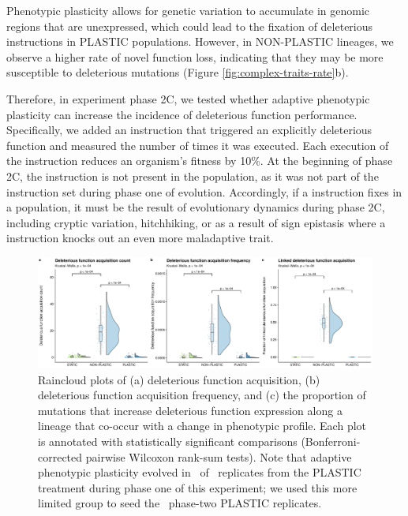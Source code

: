 \begin{raggedbottom}
Phenotypic plasticity allows for genetic variation to accumulate in genomic regions that are unexpressed, which could lead to the fixation of deleterious instructions in PLASTIC populations.
However, in NON-PLASTIC lineages, we observe a higher rate of novel function loss, indicating that they may be more susceptible to deleterious mutations (Figure \ref{fig:complex-traits-rate}b).

Therefore, in experiment phase 2C, we tested whether adaptive phenotypic plasticity can increase the incidence of deleterious function performance.
Specifically, we added an instruction that triggered an explicitly deleterious  function and measured the number of times it was executed.
Each execution of the  instruction reduces an organism's fitness by 10\%.
At the beginning of phase 2C, the  instruction is not present in the population, as it was not part of the instruction set during phase one of evolution.
Accordingly, if a  instruction fixes in a population, it must be the result of evolutionary dynamics during phase 2C, including cryptic variation, hitchhiking, or as a result of sign epistasis where a  instruction knocks out an even more maladaptive trait.

\begin{figure}[ht!]
  \centering
  \includegraphics[width=1.0\textwidth]{02_consequences_of_plasticity/media/media-poison-accumulation-panel.pdf}
  \caption{\small
  Raincloud plots of
  (a) deleterious function acquisition,
  (b) deleterious function acquisition frequency,
  and (c) the proportion of mutations that increase deleterious function expression along a lineage that co-occur with a change in phenotypic profile.
  Each plot is annotated with statistically significant comparisons (Bonferroni-corrected pairwise Wilcoxon rank-sum tests).
  Note that adaptive phenotypic plasticity evolved in \deleteriousHitchhikingPlasticReps\ of \deleteriousHitchhikingReplicates\ replicates from the PLASTIC treatment during phase one of this experiment; we used this more limited group to seed the \deleteriousHitchhikingPlasticReps\ phase-two PLASTIC replicates.
  }
  \label{fig:deleterious-hitchhiking}
\end{figure}


\end{raggedbottom}
